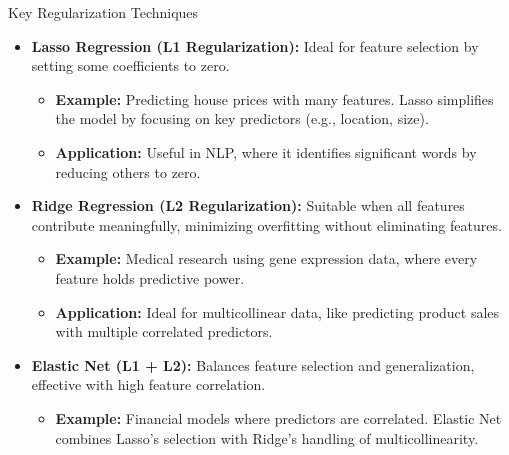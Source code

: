 \documentclass[serif, aspectratio=169]{beamer}
\begin{document}
\begin{frame}{Key Regularization Techniques}
\begin{itemize}[<+-| alert@+>]

    \item \textbf{Lasso Regression (L1 Regularization):} Ideal for feature selection by setting some coefficients to zero.
    \begin{itemize}
        \item \textbf{Example:} Predicting house prices with many features. Lasso simplifies the model by focusing on key predictors (e.g., location, size).
        \item \textbf{Application:} Useful in NLP, where it identifies significant words by reducing others to zero.
    \end{itemize}
    
    \item \textbf{Ridge Regression (L2 Regularization):} Suitable when all features contribute meaningfully, minimizing overfitting without eliminating features.
    \begin{itemize}
        \item \textbf{Example:} Medical research using gene expression data, where every feature holds predictive power.
        \item \textbf{Application:} Ideal for multicollinear data, like predicting product sales with multiple correlated predictors.
    \end{itemize}
    
    \item \textbf{Elastic Net (L1 + L2):} Balances feature selection and generalization, effective with high feature correlation.
    \begin{itemize}
        \item \textbf{Example:} Financial models where predictors are correlated. Elastic Net combines Lasso’s selection with Ridge’s handling of multicollinearity.
    \end{itemize}
    
\end{itemize}
\end{frame}
\end{document}
